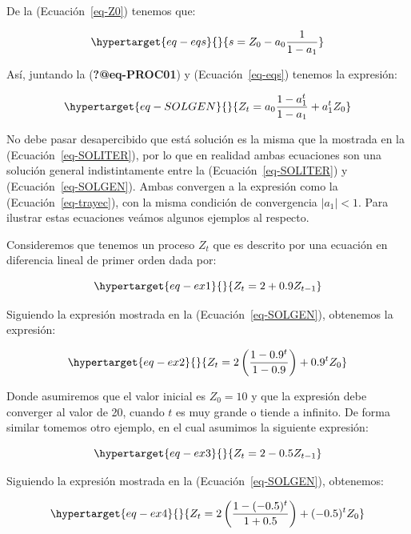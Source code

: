 \documentclass[
  a4paper,
]{article}
\begin{document}
De la (Ecuación~\ref{eq-Z0}) tenemos que:

\begin{equation}\protect\hypertarget{eq-eqs}{}{
s = Z_0 - a_0 \frac{1}{1 - a_1}
}\label{eq-eqs}\end{equation}

Así, juntando la (\textbf{?@eq-PROC01}) y (Ecuación~\ref{eq-eqs})
tenemos la expresión:

\begin{equation}\protect\hypertarget{eq-SOLGEN}{}{
Z_t = a_0 \frac{1 - a^t_1}{1 - a_1} + a^t_1 Z_0
}\label{eq-SOLGEN}\end{equation}

No debe pasar desapercibido que está solución es la misma que la
mostrada en la (Ecuación~\ref{eq-SOLITER}), por lo que en realidad ambas
ecuaciones son una solución general indistintamente entre la
(Ecuación~\ref{eq-SOLITER}) y (Ecuación~\ref{eq-SOLGEN}). Ambas
convergen a la expresión como la (Ecuación~\ref{eq-trayec}), con la
misma condición de convergencia \(|a_1| < 1\). Para ilustrar estas
ecuaciones veámos algunos ejemplos al respecto.

Consideremos que tenemos un proceso \(Z_t\) que es descrito por una
ecuación en diferencia lineal de primer orden dada por:

\begin{equation}\protect\hypertarget{eq-ex1}{}{
Z_t = 2 + 0.9 Z_{t-1}
}\label{eq-ex1}\end{equation}

Siguiendo la expresión mostrada en la (Ecuación~\ref{eq-SOLGEN}),
obtenemos la expresión:

\begin{equation}\protect\hypertarget{eq-ex2}{}{
Z_t = 2 \left( \frac{1 - 0.9^{t}}{1 - 0.9} \right) + 0.9^t Z_0
}\label{eq-ex2}\end{equation}

Donde asumiremos que el valor inicial es \(Z_0 = 10\) y que la expresión
debe converger al valor de 20, cuando \(t\) es muy grande o tiende a
infinito. De forma similar tomemos otro ejemplo, en el cual asumimos la
siguiente expresión:

\begin{equation}\protect\hypertarget{eq-ex3}{}{
Z_t = 2 - 0.5 Z_{t-1}
}\label{eq-ex3}\end{equation}

Siguiendo la expresión mostrada en la (Ecuación~\ref{eq-SOLGEN}),
obtenemos:

\begin{equation}\protect\hypertarget{eq-ex4}{}{
Z_t = 2 \left( \frac{1 - (-0.5)^{t}}{1 + 0.5} \right) + (-0.5)^t Z_0
}\label{eq-ex4}\end{equation}
\end{document}
